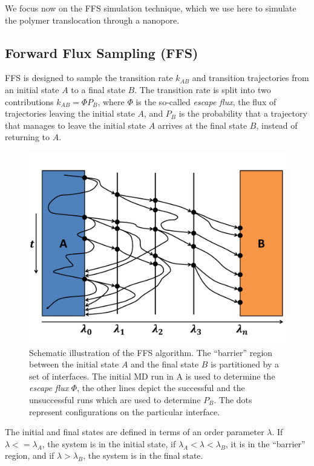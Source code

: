 \documentclass[a4paper,oneside]{article}
\begin{document}
We focus now on the FFS simulation technique, which we use here to simulate the polymer translocation through a nanopore.

\subsection{Forward Flux Sampling (FFS)}

FFS is designed to sample the transition rate $k_{AB}$ and transition trajectories from an initial state $A$ to a final state $B$. The transition rate is split into two contributions $k_{AB} = \Phi P_B $, where $\Phi$ is the so-called {\em escape flux}, the flux of trajectories leaving the initial state $A$, and $P_B$ is the probability that a trajectory that manages to leave the initial state $A$ arrives at the final state $B$, instead of returning to $A$.

\begin{figure}
\begin{center}
 \includegraphics[width=0.7\linewidth]{pics/ffs_plain}
 \caption{Schematic illustration of the FFS algorithm. The ``barrier'' region between the initial state $A$ and the final state $B$ is partitioned by a set of interfaces. The initial MD run in A is used to determine the {\em escape flux} $\Phi$, the other lines depict the successful and the unsuccessful runs which are used to determine $P_B$. The dots represent configurations on the particular interface.
 \label{fig:ffs_hyper}}
\end{center}
\end{figure}

The initial and final states are defined in terms of an order parameter $\lambda$. If $\lambda <= \lambda_A$, the system is in the initial state, if $\lambda_A < \lambda < \lambda_B$, it is in the ``barrier'' region, and if $\lambda > \lambda_B$, the system is in the final state.
\end{document}
